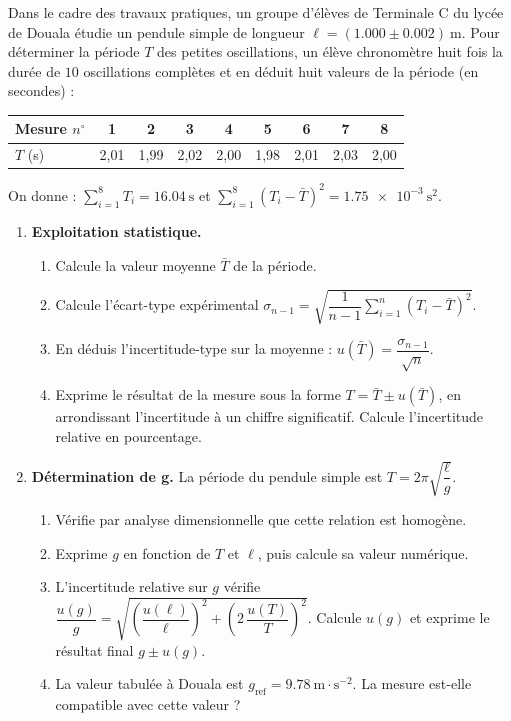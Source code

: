 \documentclass[11pt]{article}
\begin{document}
\begin{exercice}
Dans le cadre des travaux pratiques, un groupe d'élèves de Terminale C du lycée de Douala étudie un pendule simple de longueur $\ell = (\num{1,000} \pm \num{0,002})~\text{m}$. Pour déterminer la période $T$ des petites oscillations, un élève chronomètre huit fois la durée de $10$ oscillations complètes et en déduit huit valeurs de la période (en secondes) :
\begin{center}
\begin{tabular}{|l|cccccccc|}
\hline
Mesure $n^{\circ}$ & 1 & 2 & 3 & 4 & 5 & 6 & 7 & 8 \\
\hline
$T$ (s) & 2,01 & 1,99 & 2,02 & 2,00 & 1,98 & 2,01 & 2,03 & 2,00 \\
\hline
\end{tabular}
\end{center}
On donne : $\displaystyle\sum_{i=1}^{8} T_i = \num{16,04}~\text{s}$ et $\displaystyle\sum_{i=1}^{8} (T_i - \bar{T})^2 = \num{1,75e-3}~\text{s}^2$.
\begin{enumerate}
    \item \textbf{Exploitation statistique.}
    \begin{enumerate}
        \item Calcule la valeur moyenne $\bar{T}$ de la période.
        \item Calcule l'écart-type expérimental $\sigma_{n-1} = \sqrt{\dfrac{1}{n-1}\displaystyle\sum_{i=1}^{n}(T_i - \bar{T})^2}$.
        \item En déduis l'incertitude-type sur la moyenne : $u(\bar{T}) = \dfrac{\sigma_{n-1}}{\sqrt{n}}$.
        \item Exprime le résultat de la mesure sous la forme $T = \bar{T} \pm u(\bar{T})$, en arrondissant l'incertitude à un chiffre significatif. Calcule l'incertitude relative en pourcentage.
    \end{enumerate}
    \item \textbf{Détermination de g.} La période du pendule simple est $T = 2\pi\sqrt{\dfrac{\ell}{g}}$.
    \begin{enumerate}
        \item Vérifie par analyse dimensionnelle que cette relation est homogène.
        \item Exprime $g$ en fonction de $T$ et $\ell$, puis calcule sa valeur numérique.
        \item L'incertitude relative sur $g$ vérifie $\dfrac{u(g)}{g} = \sqrt{\left(\dfrac{u(\ell)}{\ell}\right)^2 + \left(2\,\dfrac{u(T)}{T}\right)^2}$. Calcule $u(g)$ et exprime le résultat final $g \pm u(g)$.
        \item La valeur tabulée à Douala est $g_{\text{ref}} = \num{9,78}~\text{m}\cdot\text{s}^{-2}$. La mesure est-elle compatible avec cette valeur ?
    \end{enumerate}
\end{enumerate}
\end{exercice}
\end{document}
